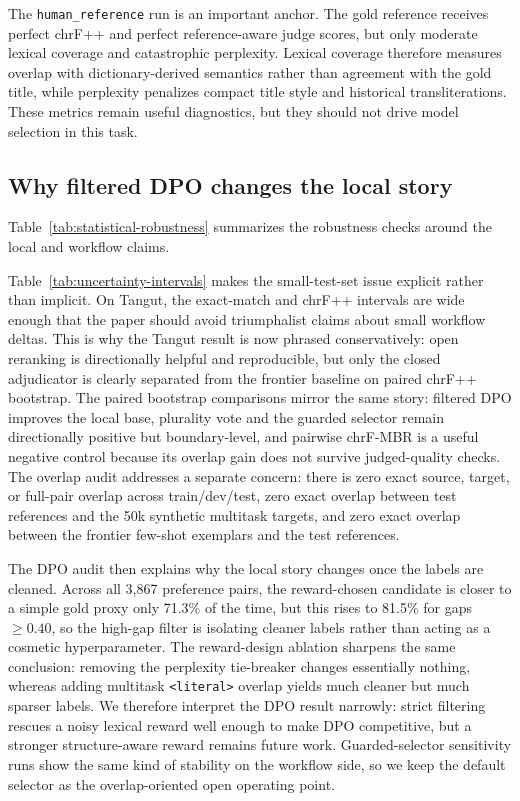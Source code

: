 The \texttt{human\_reference} run is an important anchor. The gold reference receives perfect chrF++ and perfect reference-aware judge scores, but only moderate lexical coverage and catastrophic perplexity. Lexical coverage therefore measures overlap with dictionary-derived semantics rather than agreement with the gold title, while perplexity penalizes compact title style and historical transliterations. These metrics remain useful diagnostics, but they should not drive model selection in this task.

\subsection{Why filtered DPO changes the local story}

Table~\ref{tab:statistical-robustness} summarizes the robustness checks around the local and workflow claims.





Table~\ref{tab:uncertainty-intervals} makes the small-test-set issue explicit rather than implicit. On Tangut, the exact-match and chrF++ intervals are wide enough that the paper should avoid triumphalist claims about small workflow deltas. This is why the Tangut result is now phrased conservatively: open reranking is directionally helpful and reproducible, but only the closed adjudicator is clearly separated from the frontier baseline on paired chrF++ bootstrap. The paired bootstrap comparisons mirror the same story: filtered DPO improves the local base, plurality vote and the guarded selector remain directionally positive but boundary-level, and pairwise chrF-MBR is a useful negative control because its overlap gain does not survive judged-quality checks. The overlap audit addresses a separate concern: there is zero exact source, target, or full-pair overlap across train/dev/test, zero exact overlap between test references and the 50k synthetic multitask targets, and zero exact overlap between the frontier few-shot exemplars and the test references.





The DPO audit then explains why the local story changes once the labels are cleaned. Across all 3,867 preference pairs, the reward-chosen candidate is closer to a simple gold proxy only 71.3\% of the time, but this rises to 81.5\% for gaps $\ge 0.40$, so the high-gap filter is isolating cleaner labels rather than acting as a cosmetic hyperparameter. The reward-design ablation sharpens the same conclusion: removing the perplexity tie-breaker changes essentially nothing, whereas adding multitask \texttt{<literal>} overlap yields much cleaner but much sparser labels. We therefore interpret the DPO result narrowly: strict filtering rescues a noisy lexical reward well enough to make DPO competitive, but a stronger structure-aware reward remains future work. Guarded-selector sensitivity runs show the same kind of stability on the workflow side, so we keep the default selector as the overlap-oriented open operating point.
